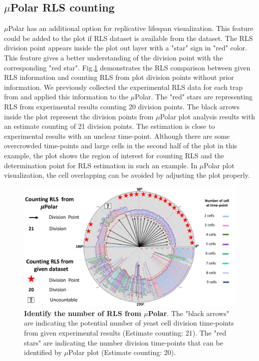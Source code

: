 \documentclass[conference]{IEEEtran}
\begin{document}
\subsection{$\mu$Polar RLS counting}
$\mu$Polar has an additional option for replicative lifespan visualization. This feature could be added to the plot if RLS dataset is available from the dataset. The RLS division point appears inside the plot out layer with a "star" sign in "red" color. This feature gives a better understanding of the division point with the corresponding "red star". Fig.\ref{fig:rls} demonstrates the RLS comparison between given RLS information and counting RLS from plot division points without prior information. We previously collected the experimental RLS data for each trap from \cite{ref02.2} and applied this information to the $\mu$Polar. The "red" stars are representing RLS from experimental results counting 20 division points. The black arrows inside the plot represent the division points from $\mu$Polar plot analysis results with an estimate counting of 21 division points. The estimation is close to experimental results with an unclear time-point. Although there are some overcrowded time-points and large cells in the second half of the plot in this example, the plot shows the region of interest for counting RLS and the determination point for RLS estimation in such an example. In $\mu$Polar plot visualization, the cell overlapping can be avoided by adjusting the plot properly.       

\begin{figure}
\centering
\includegraphics[width=\textwidth,height=10 cm]{Patterns/rlsTp1.pdf}
\caption{ \textbf{Identify the number of RLS from $\mu$Polar}. The "black arrows" are indicating the potential number of yeast cell division time-points from given experimental results (Estimate counting: 21). The "red stars" are indicating the number division time-points that can be identified by $\mu$Polar plot (Estimate counting: 20).}
\label{fig:rls}
\end{figure}
\end{document}
